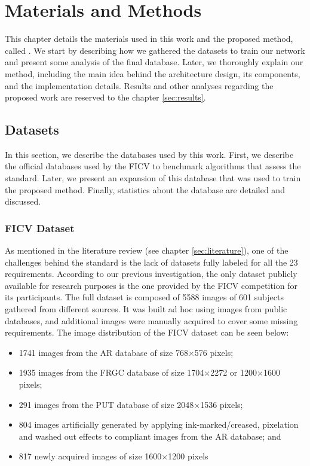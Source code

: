 \section{Materials and Methods} \label{sec:method}

This chapter details the materials used in this work and the proposed method, called \methodname. We start by describing how we gathered the datasets to train our network and present some analysis of the final database. Later, we thoroughly explain our method, including the main idea behind the architecture design, its components, and the implementation details. Results and other analyses regarding the proposed work are reserved to the chapter \ref{sec:results}.

\subsection{Datasets}

In this section, we describe the databases used by this work. First, we describe the official databases used by the FICV to benchmark algorithms that assess the \icao standard. Later, we present an expansion of this database that was used to train the proposed method. Finally, statistics about the database are detailed and discussed.

\subsubsection{FICV Dataset}

As mentioned in the literature review (see chapter \ref{sec:literature}), one of the challenges behind the \icao standard is the lack of datasets fully labeled for all the 23 requirements. According to our previous investigation, the only dataset publicly available for research purposes is the one provided by the FICV competition for its participants. The full dataset is composed of 5588 images of 601 subjects gathered from different sources. It was built ad hoc using images from public databases, and additional images were manually acquired to cover some missing requirements. The image distribution of the FICV dataset can be seen below:

\begin{itemize}
\item 1741 images from the AR database \citep{martinez1998ar} of size 768$\times$576 pixels;
\item 1935 images from the FRGC database \citep{databaseFRGC} of size 1704$\times$2272 or 1200$\times$1600 pixels;
\item 291 images from the PUT database \citep{kasinski2008put} of size 2048$\times$1536 pixels;
\item 804 images artificially generated by applying ink-marked/creased, pixelation and washed out effects to compliant images from the AR database; and
\item 817 newly acquired images of size 1600$\times$1200 pixels
\end{itemize}

